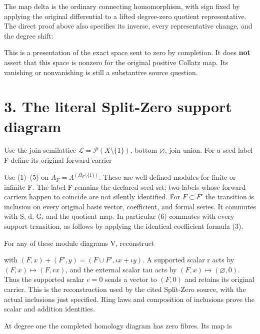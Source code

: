 The map delta is the ordinary connecting homomorphism, with sign fixed
by applying the original differential to a lifted degree-zero quotient
representative. The direct proof above also specifies its inverse, every
representative change, and the degree shift:


This is a presentation of the exact space sent to zero by completion. It
does \textbf{not} assert that this space is nonzero for the original
positive Collatz map. Its vanishing or nonvanishing is still a
substantive source question.

\section{3. The literal Split-Zero support diagram}

Use the join-semilattice \(\mathcal L=\mathcal P(X\setminus\{1\})\),
bottom \(\varnothing\), join union. For a seed label F define its
original forward carrier


Use (1)--(5) on \(A_F=\Lambda^{(\Omega_F\setminus\{1\})}\). These are
well-defined modules for finite or infinite F. The label F remains the
declared seed set; two labels whose forward carriers happen to coincide
are not silently identified. For \(F\subset F'\) the transition is
inclusion on every original basis vector, coefficient, and formal
series. It commutes with S, d, G, and the quotient map. In particular
(6) commutes with every support transition, as follows by applying the
identical coefficient formula (3).

For any of these module diagrams V, reconstruct


with \((F,x)+(F',y)=(F\cup F',\iota x+\iota y)\). A supported scalar r
acts by \((F,x)\mapsto(F,rx)\), and the external scalar tau acts by
\((F,x)\mapsto(\varnothing,0)\). Thus the supported scalar \(e=0\) sends
a vector to \((F,0)\) and retains its original carrier. This is the
reconstruction used by the cited Split-Zero source, with the actual
inclusions just specified. Ring laws and composition of inclusions prove
the scalar and addition identities.

At degree one the completed homology diagram has zero fibres. Its map is

